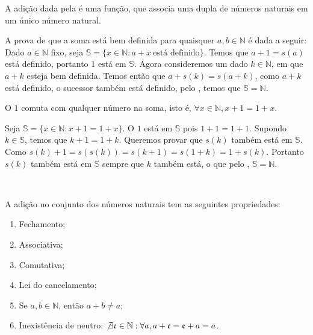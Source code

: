 \documentclass[../main.tex]{subfiles}
\begin{document}
\begin{teo}
    A adição dada pela  é uma função, que associa uma dupla de números naturais em um único número natural.
\end{teo}
\begin{dem}
    A prova de que a soma está bem definida para quaisquer $a,b \in \mathbb{N}$ é dada a seguir:
    Dado $a \in \mathbb{N}$ fixo, seja $\mathbb{S} = \{ x \in \mathbb{N} : a + x \ \text{está definido} \}$. Temos que $a + 1 = s(a)$ está definido, portanto $1$ está em $\mathbb{S}$. 
    Agora consideremos um dado $k \in \mathbb{N}$, em que $a+k$ esteja bem definida. Temos então que $a + s(k) = s(a+k)$, como $a+k$ está definido, o sucessor também está definido, pelo , temos que $\mathbb{S} = \mathbb{N}$.
\end{dem}
\begin{lema}\label{nat-lema-somaUmComuta}
    O $1$ comuta com qualquer número na soma, isto é, $ \forall x \in \mathbb{N}, x + 1 = 1 + x$.
\end{lema}
\begin{dem}
    Seja $\mathbb{S} = \{ x \in \mathbb{N} : x + 1 = 1 + x\}$. O $1$ está em $\mathbb{S}$ pois $1 + 1 = 1 + 1$.
    Supondo $k \in \mathbb{S}$, temos que $k+1 = 1+k$. Queremos provar que $s(k)$ também está em $\mathbb{S}$. Como
    $s(k) + 1 = s(s(k)) = s(k+1) = s(1+k) = 1 + s(k)$. Portanto $s(k)$ também está em $\mathbb{S}$ sempre que $k$ também está, o que pelo , $\mathbb{S} = \mathbb{N}$.
\end{dem} \\

\begin{prop}\label{nat-teo-somaPropriedades}
    A adição no conjunto dos números naturais tem as seguintes propriedades:
    \begin{enumerate}[label=(\roman*)]
        \item Fechamento;
    	\item Associativa;
    	\item Comutativa;
        \item Lei do cancelamento;
        \item Se $a,b \in \mathbb{N}$, então $a + b \neq a$;\label{nat-teo-AmaisBdiffA}
    	\item Inexistência de neutro: $\not\exists \mathfrak{e} \in \mathbb{N} : \forall a, a + \mathfrak{e} = \mathfrak{e} + a = a$.
    \end{enumerate}
\end{prop}
\end{document}
